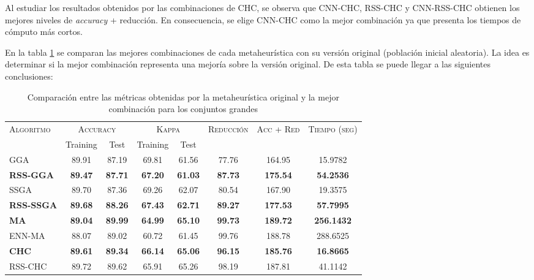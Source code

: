 Al estudiar los resultados obtenidos por las combinaciones de CHC, se observa que CNN-CHC, RSS-CHC y CNN-RSS-CHC obtienen los mejores niveles de \emph{accuracy} + reducción. En consecuencia, se elige CNN-CHC como la mejor combinación ya que presenta los tiempos de cómputo más cortos.


En la tabla \ref{large-best-all} se comparan las mejores combinaciones de cada metaheurística con su versión original (población inicial aleatoria). La idea es determinar si la mejor combinación representa una mejoría sobre la versión original. De esta tabla se puede llegar a las siguientes conclusiones:

\begin{table}[h!]
\centering
\begin{adjustbox}{max width =\textwidth}
\begin{tabular}{l c c c c c c c}
\hline
\multirow{2}{*}{\textsc{Algoritmo}}
	& \multicolumn{2}{c}{\textsc{Accuracy}}
	& \multicolumn{2}{c}{\textsc{Kappa}}
	& \textsc{Reducción}
	& \textsc{Acc + Red}
	& \textsc{Tiempo (seg)} \\
	& Training & Test
	& Training & Test \\ 
\hline
\hline

GGA  & 89.91 & 87.19 & 69.81 & 61.56 & 77.76 & 164.95 & 15.9782 \\
\textbf{RSS-GGA}      & \textbf{89.47} & \textbf{87.71} & \textbf{67.20} & \textbf{61.03} & \textbf{87.73} & \textbf{175.54} & \textbf{54.2536} \\

\hline

SSGA & 89.70 & 87.36 & 69.26 & 62.07 & 80.54 & 167.90 & 19.3575 \\
\textbf{RSS-SSGA} & \textbf{89.68} & \textbf{88.26} & \textbf{67.43} & \textbf{62.71} & \textbf{89.27} & \textbf{177.53} & \textbf{57.7995} \\

\hline

\textbf{MA}   & \textbf{89.04} & \textbf{89.99} & \textbf{64.99} & \textbf{65.10} & \textbf{99.73} & \textbf{189.72} & \textbf{256.1432} \\
ENN-MA & 88.07 & 89.02 & 60.72 & 61.45 & 99.76 & 188.78 & 288.6525 \\

\hline

\textbf{CHC}  & \textbf{89.61} & \textbf{89.34} & \textbf{66.14} & \textbf{65.06} & \textbf{96.15} & \textbf{185.76} & \textbf{16.8665} \\
RSS-CHC & 89.72 & 89.62 & 65.91 & 65.26 & 98.19 & 187.81 & 41.1142 \\

\hline
\end{tabular}
\end{adjustbox}
\caption{Comparación entre las métricas obtenidas por la metaheurística original y la mejor combinación para los conjuntos grandes}
\label{large-best-all}

\end{table}

